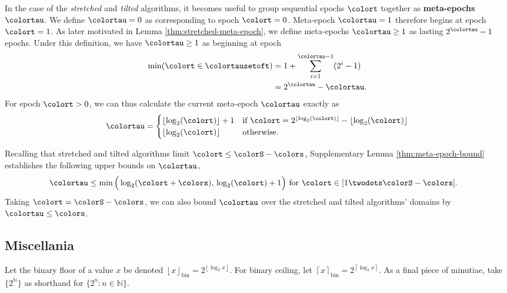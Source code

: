 In the case of the \textit{stretched} and \textit{tilted} algorithms, it becomes useful to group sequential epochs $\colort$ together as \textbf{meta-epochs} $\colortau$.
We define $\colortau=0$ as corresponding to epoch $\colort=0$.
Meta-epoch $\colortau=1$ therefore begins at epoch $\colort = 1$.
As later motivated in Lemma \ref{thm:stretched-meta-epoch}, we define meta-epochs $\colortau\geq1$ as lasting $2^{\colortau} - 1$ epochs.
Under this definition, we have $\colortau\geq1$ as beginning at epoch
\begin{align}
\min(\colort \in \colortausetoft)
&= 1 + \sum_{i=1}^{\colortau - 1} (2^{i} - 1) \\
&= 2^{\colortau} - \colortau.
\label{eqn:meta-epoch-defn}
\end{align}
For epoch $\colort > 0$, we can thus calculate the current meta-epoch $\colortau$ exactly as
\begin{align*}
\colortau
=
\begin{cases}
\left\lfloor \log_2(\colort) \right\rfloor + 1 & \text{if } \colort = 2^{\left\lfloor \log_2(\colort) \right\rfloor} - \left\lfloor \log_2(\colort) \right\rfloor \\
\left\lfloor \log_2(\colort) \right\rfloor & \text{otherwise.}
\end{cases}
\end{align*}

Recalling that stretched and tilted algorithms limit $\colort \leq \colorS - \colors$, Supplementary Lemma \ref{thm:meta-epoch-bound} establishes the following upper bounds on $\colortau$,
\begin{align*}
\colortau
&\leq
\min\Big(
  \log_2(\colort + \colors),\,
  \log_2(\colort) + 1
\Big)
\text{ for } \colort \in [1 \twodots \colorS - \colors].
\end{align*}
Taking $\colort = \colorS - \colors$, we can also bound $\colortau$ over the stretched and tilted algorithms' domains by $\colortau \leq \colors$.

\subsection{Miscellania}

Let the binary floor of a value $x$ be denoted $\left\lfloor x \right\rfloor_\mathrm{bin} = 2^{\left\lfloor \log_2 x \right\rfloor}$.
For binary ceiling, let $\left\lceil x \right\rceil_\mathrm{bin} = 2^{\left\lceil \log_2 x \right\rceil}$.
As a final piece of minutiae, take $\{2^{\mathbb{N}}\}$ as shorthand for $\{2^n : n \in \mathbb{N} \}$.
